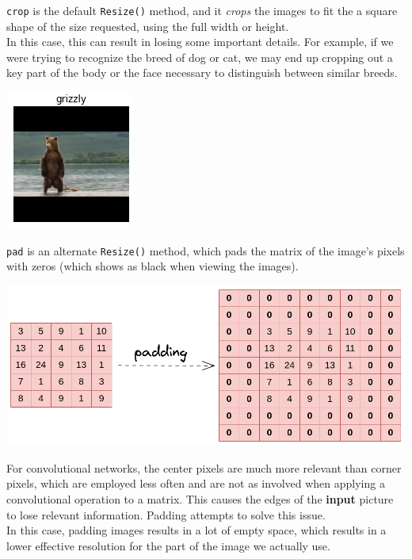 \documentclass[12pt,a4paper]{article}
\begin{document}
\begin{enumerate}
\verb/crop/ is the default \verb/Resize()/ method, and it \textit{crops} the images to fit the a square shape of the size requested, using the full width or height. \\
\smallbreak
In this case, this can result in losing some important details. For example, if we were trying to recognize the breed of dog or cat, we may end up cropping out a key part of the body or the face necessary to distinguish between similar breeds.

\begin{center}
\includegraphics[scale=1]{pad_grizzly}
\end{center}

\verb/pad/ is an alternate \verb/Resize()/ method, which pads the matrix of the image's pixels with zeros (which shows as black when viewing the images). \\

\begin{center}
\includegraphics[scale=0.5]{padding.png}
\end{center}

For convolutional networks, the center pixels are much more relevant than corner pixels, which are employed less often and are not as involved when applying a convolutional operation to a matrix. This causes the edges of the \textbf{input} picture to lose relevant information. Padding attempts to solve this issue. \\
\smallbreak
In this case, padding images results in a lot of empty space, which results in a lower effective resolution for the part of the image we actually use.


\end{enumerate}
\end{document}
